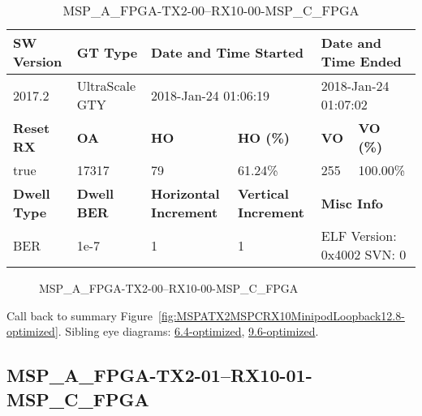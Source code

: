 \begin{table}[h]
\centering
\caption{MSP\_A\_FPGA-TX2-00--RX10-00-MSP\_C\_FPGA}
\label{tab:MSPAFPGATX200RX1000MSPCFPGA12.8-optimized}
\begin{tabular}{@{}|l|l|l|l|l|l|@{}}
\toprule
\textbf{SW Version}                & \textbf{GT Type}   & \multicolumn{2}{l|}{\textbf{Date and Time Started}}            & \multicolumn{2}{l|}{\textbf{Date and Time Ended}}        \\ \midrule
2017.2                       & UltraScale GTY          & \multicolumn{2}{l|}{2018-Jan-24 01:06:19}                   & \multicolumn{2}{l|}{2018-Jan-24 01:07:02}               \\ \midrule
\textbf{Reset RX}                  & \textbf{OA} & \textbf{HO}   & \textbf{HO (\%)} & \textbf{VO} & \textbf{VO (\%)} \\ \midrule
true & 17317        & 79          & 61.24\%        & 255        & 100.00\%       \\ \midrule
\textbf{Dwell Type}                & \textbf{Dwell BER} & \textbf{Horizontal Increment} & \textbf{Vertical Increment}    & \multicolumn{2}{l|}{\textbf{Misc Info}}                  \\ \midrule
BER                            & 1e-7        & 1        & 1           & \multicolumn{2}{l|}{ELF Version: 0x4002 SVN: 0}                         \\ \bottomrule
\end{tabular}
\end{table}

\begin{figure}[h]
\caption{MSP\_A\_FPGA-TX2-00--RX10-00-MSP\_C\_FPGA} \label{fig:MSPAFPGATX200RX1000MSPCFPGA12.8-optimized}
\end{figure}

Call back to summary Figure~\ref{fig:MSPATX2MSPCRX10MinipodLoopback12.8-optimized}.
Sibling eye diagrams: \hyperref[sec:MSPAFPGATX200RX1000MSPCFPGA6.4-optimized]{6.4-optimized}, \hyperref[sec:MSPAFPGATX200RX1000MSPCFPGA9.6-optimized]{9.6-optimized}.

\clearpage
\newpage


\subsection{MSP\_A\_FPGA-TX2-01--RX10-01-MSP\_C\_FPGA}\label{sec:MSPAFPGATX201RX1001MSPCFPGA12.8-optimized}

